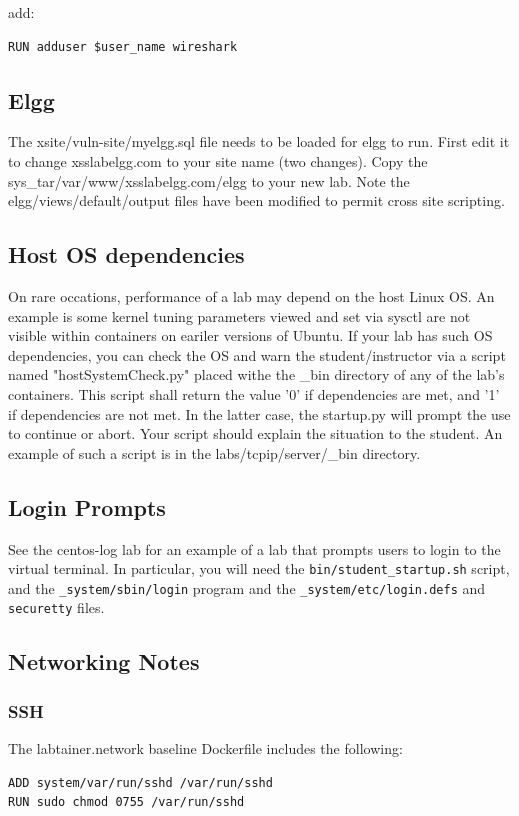 \documentclass[12pt]{article}
\begin{document}
\noindent add:

\begin{verbatim}
RUN adduser $user_name wireshark
\end{verbatim}

\subsection{Elgg}
The xsite/vuln-site/myelgg.sql file needs to be loaded for elgg to run.  First edit it to
change xsslabelgg.com to your site name (two changes).  Copy the sys\_tar/var/www/xsslabelgg.com/elgg
to your new lab.  Note the elgg/views/default/output files have been modified to permit cross site scripting.
\subsection{Host OS dependencies}
On rare occations, performance of a lab may depend on the host Linux OS.  An example is some
kernel tuning parameters viewed and set via sysctl are not visible within containers on eariler versions
of Ubuntu.  If your lab has such OS dependencies, you can check the OS and warn the student/instructor via a script
named "hostSystemCheck.py" placed withe the \_bin directory of any of the lab's containers.  This script shall
return the value '0' if dependencies are met, and '1' if dependencies are not met.  In the latter case, the 
startup.py will prompt the use to continue or abort.  Your script should explain the situation to the student.
An example of such a script is in the labs/tcpip/server/\_bin directory.
\subsection{Login Prompts}
See the centos-log lab for an example of a lab that prompts users to login to the virtual terminal.
In particular, you will need the {\tt bin/student\_startup.sh} script, and the {\tt \_system/sbin/login} program and the {\tt \_system/etc/login.defs} and {\tt securetty} files.

\subsection{Networking Notes}
\label{Networking Notes}
\subsubsection{SSH}
The labtainer.network baseline Dockerfile includes the following:
\begin{verbatim}
ADD system/var/run/sshd /var/run/sshd
RUN sudo chmod 0755 /var/run/sshd
\end{verbatim}
\end{document}
